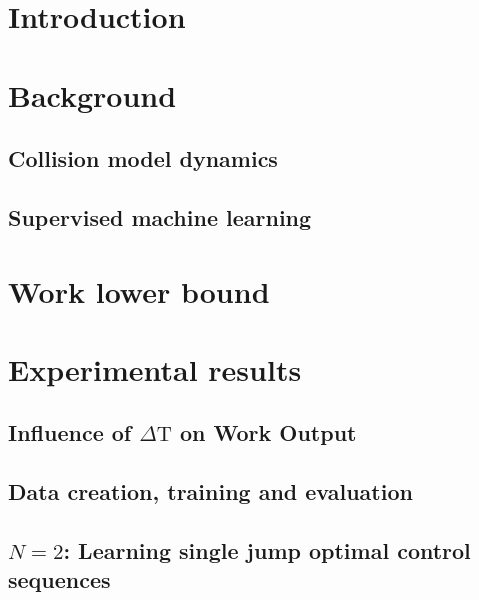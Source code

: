  
\tableofcontents



\mainmatter

\chapter{Introduction}


\chapter{Background} \label{background}
\section{Collision model dynamics} \label{col_model}


%
\section{Supervised machine learning} \label{sml}


\chapter{Work lower bound} \label{lower_bound}


\chapter{Experimental results}
\section{Influence of $\Delta \mathrm{T}$ on Work Output} \label{dep_dt}

\section{Data creation, training and evaluation}

\section{$N=2$: Learning single jump optimal control sequences} \label{n_2_ml}

